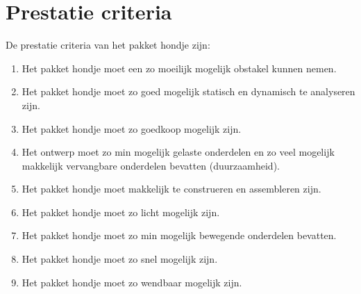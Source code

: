\section{Prestatie criteria}
\label{se:PC}

De prestatie criteria van het pakket hondje zijn:
\begin{enumerate}
    \item Het pakket hondje moet een zo moeilijk mogelijk obstakel kunnen nemen.
    \item Het pakket hondje moet zo goed mogelijk statisch en dynamisch te analyseren zijn.
    \item Het pakket hondje moet zo goedkoop mogelijk zijn.
    \item Het ontwerp moet zo min mogelijk gelaste onderdelen en zo veel mogelijk makkelijk vervangbare onderdelen bevatten (duurzaamheid).
    \item Het pakket hondje moet makkelijk te construeren en assembleren zijn.
    \item Het pakket hondje moet zo licht mogelijk zijn.
    \item Het pakket hondje moet zo min mogelijk bewegende onderdelen bevatten.
    \item Het pakket hondje moet zo snel mogelijk zijn.
    \item Het pakket hondje moet zo wendbaar mogelijk zijn.
\end{enumerate}

